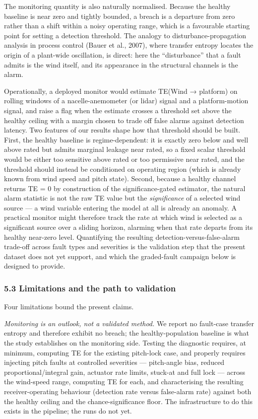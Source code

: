 \documentclass[
  english,
  11pt,
]{article}
\begin{document}
The monitoring quantity is also naturally normalised. Because the
healthy baseline is near zero and tightly bounded, a breach is a
departure from zero rather than a shift within a noisy operating range,
which is a favourable starting point for setting a detection threshold.
The analogy to disturbance-propagation analysis in process control
(Bauer et al., 2007), where transfer entropy locates the origin of a
plant-wide oscillation, is direct: here the ``disturbance'' that a fault
admits is the wind itself, and its appearance in the structural channels
is the alarm.

Operationally, a deployed monitor would estimate TE(Wind → platform) on
rolling windows of a nacelle-anemometer (or lidar) signal and a
platform-motion signal, and raise a flag when the estimate crosses a
threshold set above the healthy ceiling with a margin chosen to trade
off false alarms against detection latency. Two features of our results
shape how that threshold should be built. First, the healthy baseline is
regime-dependent: it is exactly zero below and well above rated but
admits marginal leakage near rated, so a fixed scalar threshold would be
either too sensitive above rated or too permissive near rated, and the
threshold should instead be conditioned on operating region (which is
already known from wind speed and pitch state). Second, because a
healthy channel returns TE = 0 by construction of the significance-gated
estimator, the natural alarm statistic is not the raw TE value but the
\emph{significance} of a selected wind source --- a wind variable
entering the model at all is already an anomaly. A practical monitor
might therefore track the rate at which wind is selected as a
significant source over a sliding horizon, alarming when that rate
departs from its healthy near-zero level. Quantifying the resulting
detection-versus-false-alarm trade-off across fault types and severities
is the validation step that the present dataset does not yet support,
and which the graded-fault campaign below is designed to provide.

\subsubsection{5.3 Limitations and the path to
validation}\label{limitations-and-the-path-to-validation}

Four limitations bound the present claims.

\emph{Monitoring is an outlook, not a validated method.} We report no
fault-case transfer entropy and therefore exhibit no breach; the
healthy-population baseline is what the study establishes on the
monitoring side. Testing the diagnostic requires, at minimum, computing
TE for the existing pitch-lock case, and properly requires injecting
pitch faults at controlled severities --- pitch-angle bias, reduced
proportional/integral gain, actuator rate limits, stuck-at and full lock
--- across the wind-speed range, computing TE for each, and
characterising the resulting receiver-operating behaviour (detection
rate versus false-alarm rate) against both the healthy ceiling and the
chance-significance floor. The infrastructure to do this exists in the
pipeline; the runs do not yet.
\end{document}
